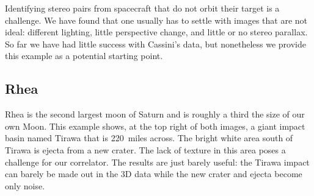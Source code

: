 Identifying stereo pairs from spacecraft that do not orbit their
target is a challenge. We have found that one usually has to settle
with images that are not ideal: different lighting, little perspective
change, and little or no stereo parallax. So far we have had little
success with Cassini's data, but nonetheless we provide this example
as a potential starting point.

\subsection{Rhea}

Rhea is the second largest moon of Saturn and is roughly a third the
size of our own Moon. This example shows, at the top right of both
images, a giant impact basin named Tirawa that is 220~miles across. The
bright white area south of Tirawa is ejecta from a new crater.  The
lack of texture in this area poses a challenge for our correlator. The
results are just barely useful: the Tirawa impact can barely be made
out in the 3D data while the new crater and ejecta become only noise.

